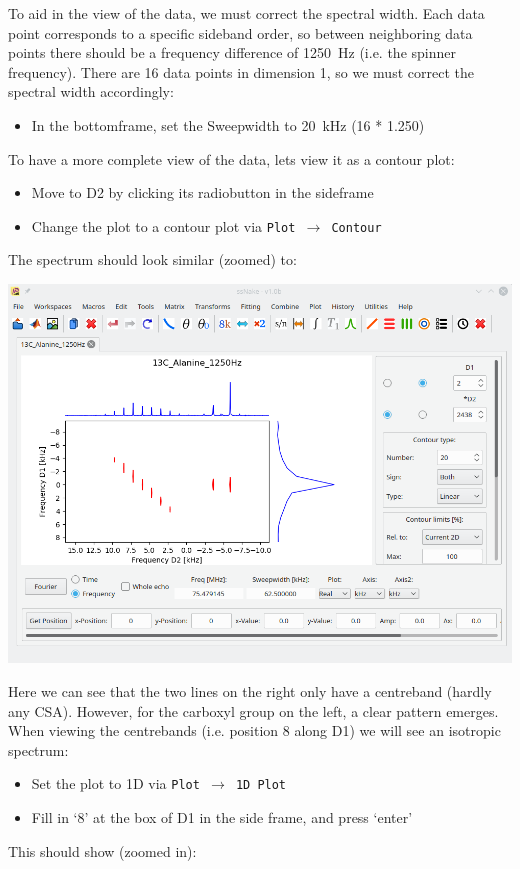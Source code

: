 \documentclass[11pt,a4paper]{article}
\begin{document}
To aid in the view of the data, we must correct the spectral width.
Each data point corresponds to a specific sideband order, so between neighboring data points there should be a frequency difference of \SI{1250}{\Hz} (i.e. the spinner frequency).
There are 16 data points in dimension 1, so we must correct the spectral width accordingly:
\begin{itemize}
  \item In the bottomframe, set the Sweepwidth to \SI{20}{\kHz} (16 * 1.250)
\end{itemize}
To have a more complete view of the data, lets view it as a contour plot:
\begin{itemize}
  \item Move to D2 by clicking its radiobutton in the sideframe
  \item Change the plot to a contour plot via \texttt{Plot $\longrightarrow$ Contour}
\end{itemize}
The spectrum should look similar (zoomed) to:
\begin{center}
\includegraphics[width=0.8\linewidth]{Figs/Fig4.png}
\end{center}
Here we can see that the two lines on the right only have a centreband (hardly any CSA).
However, for the carboxyl group on the left, a clear pattern emerges.
When viewing the centrebands (i.e. position 8 along D1) we will see an isotropic spectrum:
\begin{itemize}
  \item Set the plot to 1D via \texttt{Plot $\longrightarrow$ 1D Plot}
  \item Fill in `8' at the box of D1 in the side frame, and press `enter'
\end{itemize}
This should show (zoomed in):
\end{document}
